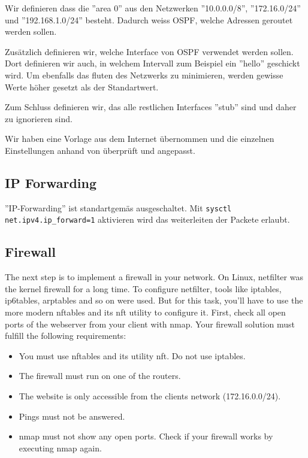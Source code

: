 \documentclass[11pt,titlepage]{article}
\newenvironment{shadedquotation}
 {\begin{shaded*}
  \quoting[leftmargin=0pt, vskip=0pt]
 }
 {\endquoting
 \end{shaded*}
}
\begin{document}
Wir definieren dass die ''area 0'' aus den Netzwerken ''10.0.0.0/8'', ''172.16.0/24'' und ''192.168.1.0/24'' besteht. Dadurch weiss OSPF, welche Adressen geroutet werden sollen.

Zusätzlich definieren wir, welche Interface von OSPF verwendet werden sollen. Dort definieren wir auch, in welchem Intervall zum Beispiel ein ''hello'' geschickt wird.
Um ebenfalls das fluten des Netzwerks zu minimieren, werden gewisse Werte höher gesetzt als der Standartwert.

Zum Schluss definieren wir, das alle restlichen Interfaces ''stub'' sind und daher zu ignorieren sind.

\medskip
Wir haben eine Vorlage aus dem Internet übernommen \cite{BIRD_EXAMPLE} und die einzelnen Einstellungen anhand von \cite{BIRD_DOC} überprüft und angepasst.

\subsection{IP Forwarding}
\label{subsec:IPForwarding}

''IP-Forwarding'' ist standartgemäs ausgeschaltet. Mit \lstinline!sysctl net.ipv4.ip_forward=1! aktivieren wird das weiterleiten der Packete erlaubt.

\subsection{Firewall}
\label{subsec:Firewall}
\begin{shadedquotation}
	The next step is to implement a firewall in your network. On Linux, netfilter was the kernel
	firewall for a long time. To configure netfilter, tools like iptables, ip6tables, arptables and so
	on were used. But for this task, you’ll have to use the more modern nftables and its nft utility
	to configure it.
	First, check all open ports of the webserver from your client with nmap. Your firewall solution
	must fulfill the following requirements:
	\begin{itemize}
		\item You must use nftables and its utility nft. Do not use iptables.
		\item The firewall must run on one of the routers.
		\item The website is only accessible from the clients network (172.16.0.0/24).
		\item Pings must not be answered.
		\item nmap must not show any open ports. Check if your firewall works by executing nmap again.
	\end{itemize}
\end{shadedquotation}
\end{document}
